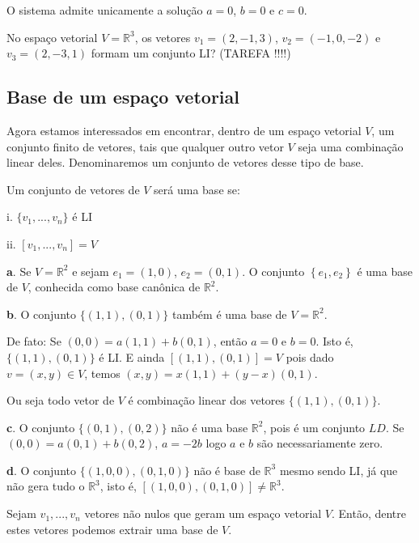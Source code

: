 O sistema admite unicamente a solução $a=0$, $b=0$ e $c=0$.

\begin{ex}
	No espaço vetorial $V=\mathbb{R}^{3}$, os vetores $v_{1}=(2,-1,3)$, $v_{2}=(-1,0,-2)$ e $v_{3}=(2,-3,1)$ formam um conjunto LI? (TAREFA !!!!)
\end{ex}

\subsection{Base de um espaço vetorial}

Agora estamos interessados em encontrar, dentro de um espaço vetorial $V$, um conjunto finito de vetores, tais que qualquer outro vetor $V$ seja uma combinação linear deles. Denominaremos um conjunto de vetores desse tipo de base.

\begin{df}
	Um conjunto de vetores de $V$ será uma base se:
	\item[i.] $\{v_{1},...,v_{n}\}$ é LI
	\item[ii.] $[v_{1},...,v_{n}]=V$
\end{df}

\begin{ex}
	\item[\textbf{a}.] Se $V=\mathbb{R}^{2}$ e sejam $e_{1}=(1,0)$, $e_{2}=(0,1)$. O conjunto $\left\lbrace e_{1}, e_{2}\right\rbrace$ é uma base de $V$, conhecida como base canônica de $\mathbb{R}^{2}$.
	\item[\textbf{b}.] O conjunto $\{(1,1),(0,1)\}$ também é uma base de $V=\mathbb{R}^{2}$. 
	
	De fato: Se $(0,0)=a(1,1)+b(0,1)$, então $a=0$ e $b=0$. Isto é, $\{(1,1),(0,1)\}$ é LI. E ainda $[(1,1),(0,1)]=V$ pois dado $v=(x,y)\in V$, temos $(x,y)=x(1,1)+(y-x)(0,1)$. 
	
	Ou seja todo vetor de $V$ é combinação linear dos vetores $\{(1,1),(0,1)\}$.
	\item[\textbf{c}.] O conjunto $\{(0,1),(0,2)\}$ não é uma base $\mathbb{R}^{2}$, pois é um conjunto $LD$. Se $(0,0)=a(0,1)+b(0,2)$, $a=-2b$ logo $a$ e $b$ são necessariamente zero. 
	\item[\textbf{d}.] O conjunto $\{(1,0,0),(0,1,0)\}$ não é base de $\mathbb{R}^{3}$ mesmo sendo LI, já que não gera tudo o $\mathbb{R}^{3}$, isto é, $\left[ (1,0,0),(0,1,0)\right] \neq \mathbb{R}^{3}$. 
\end{ex}
\begin{teo}
Sejam $v_{1},...,v_{n}$ vetores não nulos que geram um espaço vetorial $V$. Então, dentre estes vetores podemos extrair uma base de $V$.	
\end{teo}

